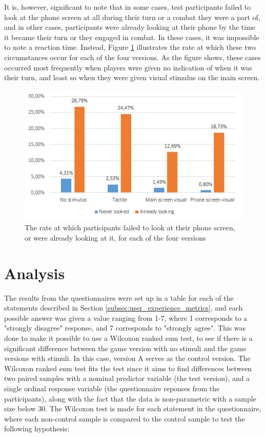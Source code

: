 It is, however, significant to note that in some cases, test participants failed to look at the phone screen at all during their turn or a combat they were a part of, and in other cases, participants were already looking at their phone by the time it became their turn or they engaged in combat. In these cases, it was impossible to note a reaction time. Instead, Figure \ref{fig:looked} illustrates the rate at which these two circumstances occur for each of the four versions. As the figure shows, these cases occurred most frequently when players were given no indication of when it was their turn, and least so when they were given visual stimulus on the main screen. 

\begin{figure}[h!]
	\centering
	\includegraphics[scale=1]{figures/graph_looked.png}
	\caption{The rate at which participants failed to look at their phone screen, or were already looking at it, for each of the four versions}\label{fig:looked}
\end{figure}

\section{Analysis}
The results from the questionnaires were set up in a table for each of the statements described in Section \ref{subsec:user_experience_metrics}, and each possible answer was given a value ranging from 1-7, where 1 corresponds to a "strongly disagree" response, and 7 corresponds to "strongly agree". This was done to make it possible to use a Wilcoxon ranked sum test, to see if there is a significant difference between the game version with no stimuli and the game versions with stimuli. In this case, version A serves as the control version. The Wilcoxon ranked sum test fits the test since it aims to find differences between two paired samples with a nominal predictor variable (the test version), and a single ordinal response variable (the questionnaire reponses from the participants), along with the fact that the data is non-parametric with a sample size below 30. The Wilcoxon test is made for each statement in the questionnaire, where each non-control sample is compared to the control sample to test the following hypothesis:

